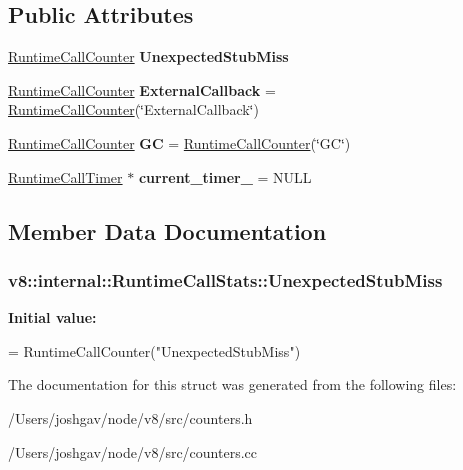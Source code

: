 \subsection*{Public Attributes}
\begin{DoxyCompactItemize}
\item 
\hyperlink{structv8_1_1internal_1_1_runtime_call_counter}{Runtime\+Call\+Counter} {\bfseries Unexpected\+Stub\+Miss}
\item 
\hyperlink{structv8_1_1internal_1_1_runtime_call_counter}{Runtime\+Call\+Counter} {\bfseries External\+Callback} = \hyperlink{structv8_1_1internal_1_1_runtime_call_counter}{Runtime\+Call\+Counter}(\char`\"{}External\+Callback\char`\"{})\hypertarget{structv8_1_1internal_1_1_runtime_call_stats_a5f2d6db1674a97f623a879ef50a9b7a1}{}\label{structv8_1_1internal_1_1_runtime_call_stats_a5f2d6db1674a97f623a879ef50a9b7a1}

\item 
\hyperlink{structv8_1_1internal_1_1_runtime_call_counter}{Runtime\+Call\+Counter} {\bfseries GC} = \hyperlink{structv8_1_1internal_1_1_runtime_call_counter}{Runtime\+Call\+Counter}(\char`\"{}GC\char`\"{})\hypertarget{structv8_1_1internal_1_1_runtime_call_stats_a79b6a88c8722872adb1017193fbb4dd6}{}\label{structv8_1_1internal_1_1_runtime_call_stats_a79b6a88c8722872adb1017193fbb4dd6}

\item 
\hyperlink{classv8_1_1internal_1_1_runtime_call_timer}{Runtime\+Call\+Timer} $\ast$ {\bfseries current\+\_\+timer\+\_\+} = N\+U\+LL\hypertarget{structv8_1_1internal_1_1_runtime_call_stats_a13ca7069975e9aa577cb9e805f0da45a}{}\label{structv8_1_1internal_1_1_runtime_call_stats_a13ca7069975e9aa577cb9e805f0da45a}

\end{DoxyCompactItemize}


\subsection{Member Data Documentation}
\subsubsection[{\texorpdfstring{Unexpected\+Stub\+Miss}{UnexpectedStubMiss}}]{ v8\+::internal\+::\+Runtime\+Call\+Stats\+::\+Unexpected\+Stub\+Miss}\hypertarget{structv8_1_1internal_1_1_runtime_call_stats_aece77b87a66bf986d7526677bb7c61e6}{}\label{structv8_1_1internal_1_1_runtime_call_stats_aece77b87a66bf986d7526677bb7c61e6}
{\bfseries Initial value\+:}
\begin{DoxyCode}
=
      RuntimeCallCounter(\textcolor{stringliteral}{"UnexpectedStubMiss"})
\end{DoxyCode}


The documentation for this struct was generated from the following files\+:\begin{DoxyCompactItemize}
\item 
/\+Users/joshgav/node/v8/src/counters.\+h\item 
/\+Users/joshgav/node/v8/src/counters.\+cc\end{DoxyCompactItemize}

